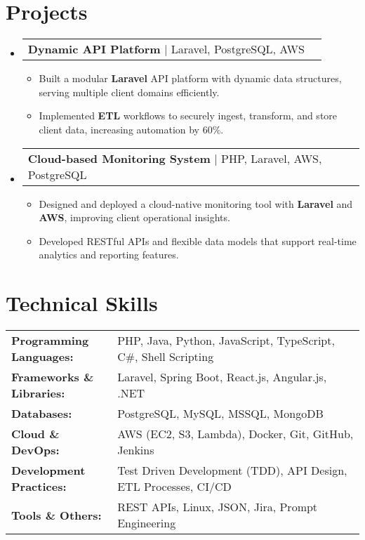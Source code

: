 \documentclass[letterpaper,11pt]{article}
\makeatletter
\newcommand{\resumeItem}[1]{
  \item\footnotesize{
    {#1 \vspace{-2pt}}
  }
}
\newcommand{\resumeProjectHeading}[2]{
    \item
    \begin{tabular*}{1.001\textwidth}{l@{\extracolsep{\fill}}r}
      \small#1 & \textbf{\small #2}\\
    \end{tabular*}\vspace{-7pt}
}
\newcommand{\resumeSubHeadingListStart}{\begin{itemize}[leftmargin=0pt, label={}]}
\newcommand{\resumeSubHeadingListEnd}{\end{itemize}}
\newcommand{\resumeItemListStart}{\begin{itemize}[leftmargin=*]}
\newcommand{\resumeItemListEnd}{\end{itemize}\vspace{-5pt}}
\makeatother
\begin{document}
\section{Projects}
    \vspace{-5pt}
    \resumeSubHeadingListStart
      \resumeProjectHeading
          {\textbf{Dynamic API Platform} | Laravel, PostgreSQL, AWS}
          {}
          \resumeItemListStart
              \resumeItem{Built a modular \textbf{Laravel} API platform with dynamic data structures, serving multiple client domains efficiently.}
              \resumeItem{Implemented \textbf{ETL} workflows to securely ingest, transform, and store client data, increasing automation by 60\%.}
          \resumeItemListEnd
          \vspace{-16pt}
      \resumeProjectHeading
          {\textbf{Cloud-based Monitoring System} | PHP, Laravel, AWS, PostgreSQL}
          {}
          \resumeItemListStart
              \resumeItem{Designed and deployed a cloud-native monitoring tool with \textbf{Laravel} and \textbf{AWS}, improving client operational insights.}
              \resumeItem{Developed RESTful APIs and flexible data models that support real-time analytics and reporting features.}
          \resumeItemListEnd
    \resumeSubHeadingListEnd
\vspace{-10pt}
\section{Technical Skills}
        \vspace{-14pt}
        \begin{table}[h]
            \footnotesize
            \begin{tabular}{p{0.3\linewidth} p{0.7\linewidth}}
                \textbf{Programming Languages:} & PHP, Java, Python, JavaScript, TypeScript, C\#, Shell Scripting \\
                \textbf{Frameworks \& Libraries:} & Laravel, Spring Boot, React.js, Angular.js, .NET \\
                \textbf{Databases:} & PostgreSQL, MySQL, MSSQL, MongoDB \\
                \textbf{Cloud \& DevOps:} & AWS (EC2, S3, Lambda), Docker, Git, GitHub, Jenkins \\
                \textbf{Development Practices:} & Test Driven Development (TDD), API Design, ETL Processes, CI/CD \\
                \textbf{Tools \& Others:} & REST APIs, Linux, JSON, Jira, Prompt Engineering \\
            \end{tabular}
        \end{table}
\end{document}
